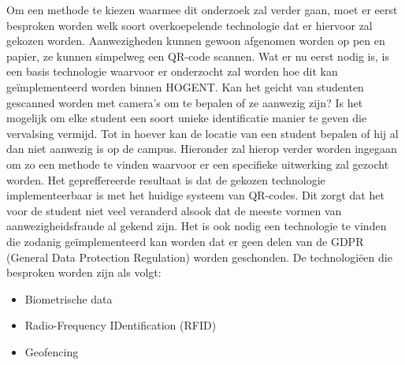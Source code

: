 
Om een methode te kiezen waarmee dit onderzoek zal verder gaan, moet er eerst besproken worden welk soort overkoepelende technologie dat er hiervoor zal gekozen worden. Aanwezigheden kunnen gewoon afgenomen worden op pen en papier, ze kunnen simpelweg een QR-code scannen. Wat er nu eerst nodig is, is een basis technologie waarvoor er onderzocht zal worden hoe dit kan geïmplementeerd worden binnen HOGENT. Kan het geicht van studenten gescanned worden met camera's om te bepalen of ze aanwezig zijn? Is het mogelijk om elke student een soort unieke identificatie manier te geven die vervalsing vermijd. Tot in hoever kan de locatie van een student bepalen of hij al dan niet aanwezig is op de campus. Hieronder zal hierop verder worden ingegaan om zo een methode te vinden waarvoor er een specifieke uitwerking zal gezocht worden. Het gepreffereerde resultaat is dat de gekozen technologie implementeerbaar is met het huidige systeem van QR-codes. Dit zorgt dat het voor de student niet veel veranderd alsook dat de meeste vormen van aanwezigheidsfraude al gekend zijn. Het is ook nodig een technologie te vinden die zodanig geïmplementeerd kan worden dat er geen delen van de GDPR (General Data Protection Regulation) worden geschonden. De technologiëen die besproken worden zijn als volgt:
\begin{itemize}
	\item Biometrische data
	\item Radio-Frequency IDentification (RFID)
	\item Geofencing
\end{itemize}


